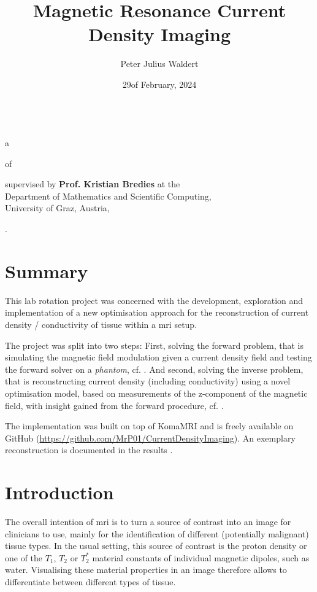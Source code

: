 \documentclass[10pt]{article}
\title{Magnetic Resonance Current Density Imaging}
\author{Peter Julius Waldert}
\date{29\th of February, 2024}
\begin{document}
  \makeatletter
  \begin{center}
    {\Huge \@title} \\
    a\hspace{.4em}{\large BioTechMed-Graz Lab Rotation Report}
    \vspace{.5cm}

    of\hspace{.5em}{\large \@author}
    \vspace{.3cm}

    supervised by \textbf{Prof. Kristian Bredies} at the \\
    Department of Mathematics and Scientific Computing, \\
    University of Graz, Austria,
    \vspace{.3cm}

    {\@date}.
  \end{center}
  \makeatother

  \section{Summary}
  This lab rotation project was concerned with the development, exploration and implementation of a new optimisation approach for the reconstruction of current density / conductivity of tissue within a \gls{mri} setup.

  The project was split into two steps: First, solving the forward problem, that is simulating the magnetic field modulation given a current density field and testing the forward solver on a \textit{phantom}, cf. .
  And second, solving the inverse problem, that is reconstructing current density (including conductivity) using a novel optimisation model, based on measurements of the z-component of the magnetic field, with insight gained from the forward procedure, cf. .

  The implementation was built on top of KomaMRI \parencite{2022-koma-mri} and is freely available on GitHub (\url{https://github.com/MrP01/CurrentDensityImaging}).
  An exemplary reconstruction is documented in the results .

  \section{Introduction}
  The overall intention of \gls{mri} is to turn a source of contrast into an image for clinicians to use, mainly for the identification of different (potentially malignant) tissue types.
  In the usual setting, this source of contrast is the proton density or one of the $T_1$, $T_2$ or $T_2^*$ material constants of individual magnetic dipoles, such as water.
  Visualising these material properties in an image therefore allows to differentiate between different types of tissue.
\end{document}
